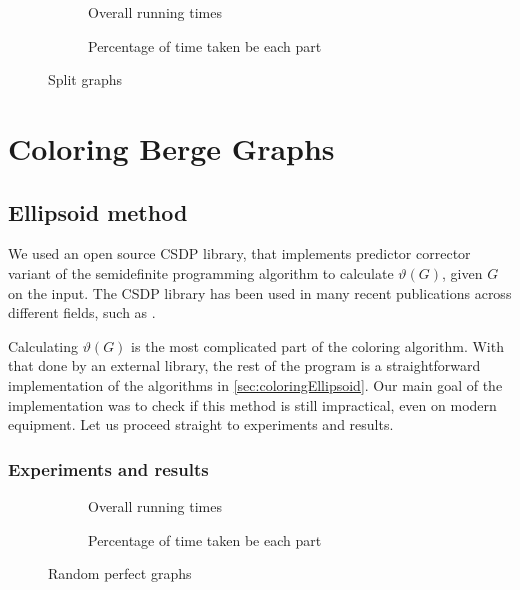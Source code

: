 \begin{figure}
  \begin{subfigure}{\textwidth}
    \centering
    
    \caption{Overall running times}
    \label{plot:splitLines}
  \end{subfigure}

  \begin{subfigure}{\textwidth}
    \centering
    
    \caption{Percentage of time taken be each part}
    \label{plot:splitDet}
  \end{subfigure}
  \caption{Split graphs}
\end{figure}

\pagebreak
\section{Coloring Berge Graphs}

\subsection{Ellipsoid method}

We used an open source CSDP \cite{csdpRepo, csdp1999} library, that implements predictor corrector variant of the semidefinite programming algorithm to calculate $\vartheta(G)$, given $G$ on the input. The CSDP library has been used in many recent publications across different fields, such as \cite{Ampountolas_2017, Adasme_2011}.


Calculating $\vartheta(G)$ is the most complicated part of the coloring algorithm. With that done by an external library, the rest of the program is a straightforward implementation of the algorithms in \cref{sec:coloringEllipsoid}. Our main goal of the implementation was to check if this method is still impractical, even on modern equipment. Let us proceed straight to experiments and results.

\subsubsection{Experiments and results}

\begin{figure}
  \begin{subfigure}{.5\textwidth}
    \centering
    
    \caption{Overall running times}
  \end{subfigure}%
  \begin{subfigure}{.5\textwidth}
    \centering
    
    \caption{Percentage of time taken be each part}
  \end{subfigure}
  \caption{Random perfect graphs}
\end{figure}

